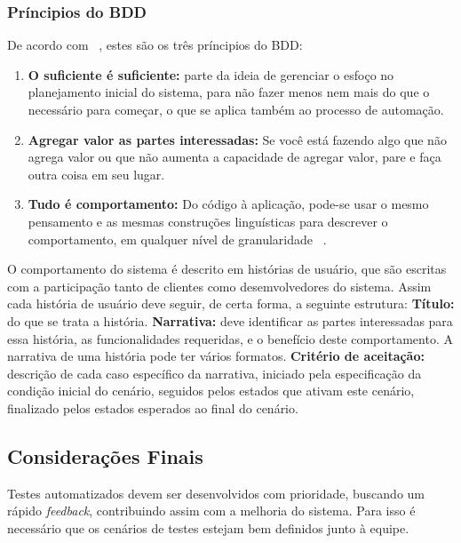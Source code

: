 \subsubsection{Príncipios do BDD}
De acordo com ~, estes são os três príncipios do BDD:
\begin{enumerate}
\item \textbf{O suficiente é suficiente:} parte da ideia de gerenciar o esfoço no 
planejamento inicial do sistema, para não fazer menos nem mais do que o necessário 
para começar, o que se aplica também ao processo de automação.
\item \textbf{Agregar valor as partes interessadas:} Se você está fazendo algo que 
não agrega valor ou que não aumenta a capacidade de agregar valor, pare e faça outra 
coisa em seu lugar.
\item \textbf{Tudo é comportamento:} Do código à aplicação, pode-se usar o mesmo 
pensamento e as mesmas construções linguísticas para descrever o comportamento, em 
qualquer nível de granularidade ~. 
\end{enumerate}
%
O comportamento do sistema é descrito em histórias de usuário, que são 
escritas com a participação tanto de clientes como desemvolvedores do sistema. Assim 
cada história de usuário deve seguir, de certa forma, a seguinte estrutura:
%
\textbf{Título:} do que se trata a história.
%
\textbf{Narrativa:} deve identificar as partes interessadas para essa história, as 
funcionalidades requeridas, e o benefício deste comportamento. A narrativa de uma 
história pode ter vários formatos.
%
\textbf{Critério de aceitação:} descrição de cada caso específico da narrativa, 
iniciado pela especificação da condição inicial do cenário, seguidos pelos estados 
que ativam este cenário, finalizado pelos estados esperados ao final do cenário.
%

\subsection{Considerações Finais}
Testes automatizados devem ser desenvolvidos com prioridade, buscando um rápido 
\textit{feedback}, contribuindo assim com a melhoria do sistema. Para isso é 
necessário que os cenários de testes estejam bem definidos junto à equipe.
%
